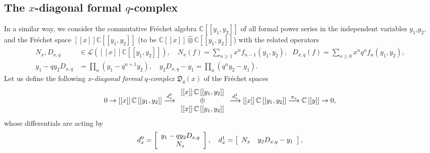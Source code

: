 \documentclass[12pt,reqno]{amsart}%
\theoremstyle{plain}
\numberwithin{theorem}{section} \numberwithin{equation}{section}
\numberwithin{lemma}{section}
\numberwithin{remark}{section}
\numberwithin{example}{section}
\numberwithin{proposition}{section}
\numberwithin{definition}{section}
\numberwithin{corollary}{section}
\begin{document}
\subsection{The $x$-diagonal formal $q$-complex\label{subsecRDC}}

In a similar way, we consider the commutative Fr\'{e}chet algebra
$\mathbb{C}\left[  \left[  y_{1},y_{2}\right]  \right]  $ of all formal power
series in the independent variables $y_{1}$,$y_{2}$, and the Fr\'{e}chet space
$\left[  \left[  x\right]  \right]  \mathbb{C}\left[  \left[  y_{1}%
,y_{2}\right]  \right]  $ (to be $\mathbb{C}\left[  \left[  x\right]  \right]
\widehat{\otimes}\mathbb{C}\left[  \left[  y_{1},y_{2}\right]  \right]  $)
with the related operators
\begin{align*}
N_{x},D_{x,q}  &  \in\mathcal{L}\left(  \left[  \left[  x\right]  \right]
\mathbb{C}\left[  \left[  y_{1},y_{2}\right]  \right]  \right)  ,\quad
N_{x}\left(  f\right)  =\sum_{n\geq1}x^{n}f_{n-1}\left(  y_{1},y_{2}\right)
,\text{ }D_{x,q}\left(  f\right)  =\sum_{n\geq0}x^{n}q^{n}f_{n}\left(
y_{1},y_{2}\right)  ,\\
y_{1}-qy_{2}D_{x,q}  &  =\prod\limits_{n}\left(  y_{1}-q^{n+1}y_{2}\right)
,\quad y_{2}D_{x,q}-y_{1}=\prod\limits_{n}\left(  q^{n}y_{2}-y_{1}\right)  .
\end{align*}
Let us define the following\textit{ }$x$-\textit{diagonal formal }%
$q$\textit{-complex} $\mathfrak{D}_{q}\left(  x\right)  $ of the Fr\'{e}chet
spaces
\[
0\rightarrow\left[  \left[  x\right]  \right]  \mathbb{C}\left[  \left[
y_{1},y_{2}\right]  \right]  \overset{d_{x}^{0}}{\longrightarrow}%
\begin{array}
[c]{c}%
\left[  \left[  x\right]  \right]  \mathbb{C}\left[  \left[  y_{1}%
,y_{2}\right]  \right] \\
\oplus\\
\left[  \left[  x\right]  \right]  \mathbb{C}\left[  \left[  y_{1}%
,y_{2}\right]  \right]
\end{array}
\overset{d_{x}^{1}}{\longrightarrow}\left[  \left[  x\right]  \right]
\mathbb{C}\left[  \left[  y_{1},y_{2}\right]  \right]  \overset{\pi
_{x}}{\longrightarrow}\mathbb{C}\left[  \left[  y\right]  \right]
\rightarrow0,
\]
whose differentials are acting by%
\[
d_{x}^{0}=\left[
\begin{array}
[c]{c}%
y_{1}-qy_{2}D_{x,q}\\
N_{x}%
\end{array}
\right]  ,\quad d_{x}^{1}=\left[
\begin{array}
[c]{cc}%
N_{x} & y_{2}D_{x,q}-y_{1}%
\end{array}
\right]  ,
\]
\end{document}
